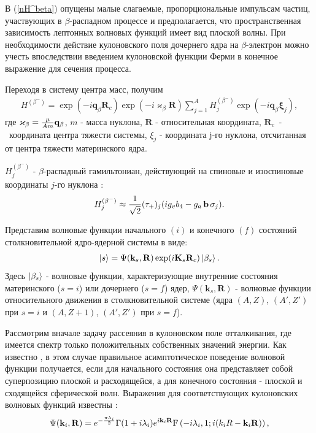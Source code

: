 \documentclass[%
master,    %
natbib,      %
subf,        %
href,        %
colorlinks,  %
]{disser}
\let\vec=\mathbf
\begin{document}
В (\ref{nH^beta}) опущены малые слагаемые, пропорциональные импульсам частиц,
участвующих в $\beta$-распадном процессе и предполагается, что пространственная
зависимость лептонных волновых функций имеет вид плоской волны.
При необходимости действие
кулоновского поля дочернего ядра на $\beta$-электрон можно учесть
впоследствии введением кулоновской функции
Ферми в конечное выражение для сечения процесса.

Переходя в систему центра масс, получим
\begin{eqnarray}\label{H^beta}
H^{(\beta^-)}=\exp{(-i\vec q_\beta\vec R_c)}\exp{( -i \vec \varkappa_\beta \vec R)}
\sum_{j=1}^A H^{(\beta^-)}_{j}\exp{(-i\vec q_\beta\vec\xi_{j})},
\end{eqnarray}
где  $\vec \varkappa_\beta=
{\mu\over Am}\vec q_\beta$, $m$ - масса нуклона,
$\vec R$ - относительная координата, $\vec R_c$~-~координата
центра тяжести системы,
$\xi_j$  - координата j-го нуклона, отсчитанная от центра тяжести материнского
ядра.

$H^{(\beta^-)}_{j}$ - $\beta$-распадный гамильтониан, действующий
на спиновые и изоспиновые координаты $j$-го нуклона \cite{aiz}:
\begin{eqnarray}
H^{(\beta^-)}_{j}\approx {1\over{\sqrt 2}}(\tau_+)_j ( i g_v b_4 - g_a\, \vec b\, \vec \sigma_j ).\nonumber
\end{eqnarray}


Представим волновые функции начального $(i)$ и конечного $(f)$ состояний
столкновительной ядро-ядерной системы в виде:
\begin{eqnarray}
\ket{s}= \Psi(\vec k_s, \vec R)\exp(i \vec K_s \vec R_c) \ket{ \beta_s}.
\end{eqnarray}
Здесь
$\ket{ \beta_s}$ - волновые функции, характеризующие внутренние состояния
материнского ($s=i$) или дочернего ($s=f$) ядер,
$\Psi (\vec k_s, \vec R)$ - волновые функции относительного движения в
столкновительной системе (ядра $(A,Z)$, $(A',Z')$ при $s=i$
и $(A,Z+1)$, $(A',Z')$ при $s=f$).

Рассмотрим вначале задачу рассеяния в кулоновском поле отталкивания, где имеется  спектр только положительных собственных
значений энергии. Как известно \cite{landau}, в этом случае правильное асимптотическое поведение волновой функции
получается, если для начального состояния она представляет собой суперпозицию плоской и расходящейся, а для конечного
состояния - плоской и сходящейся сферической волн. Выражения для соответствующих кулоновских волновых функций известны
\cite{landau}:
\begin{eqnarray}\label{psi_i}
\Psi (\vec k_i, \vec R)=e^{-{\pi \lambda_i\over2}} \Gamma(1+i\lambda_i)
e^{i \vec k_i \vec R} {\rm F} \left(- i \lambda_i,1;i(k_i R - \vec k_i \vec R)\right),
\end{eqnarray}
\end{document}
